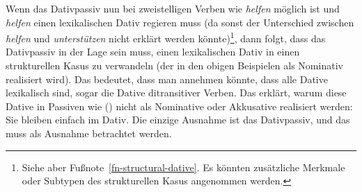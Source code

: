 Wenn das Dativpassiv nun bei zweistelligen Verben wie \emph{helfen} möglich ist und \emph{helfen}
einen lexikalischen Dativ regieren muss (da sonst der Unterschied zwischen \emph{helfen} und
\emph{unterstützen} nicht erklärt werden könnte)\footnote{%
  Siehe aber Fußnote~\ref{fn-structural-dative}. Es könnten zusätzliche Merkmale oder Subtypen des
  strukturellen Kasus angenommen werden.},
dann folgt, dass das Dativpassiv in der Lage sein muss,
einen lexikalischen Dativ in einen strukturellen Kasus zu verwandeln (der in den obigen Beispielen als Nominativ realisiert wird). Das
bedeutet, dass man annehmen könnte, dass alle Dative lexikalisch sind, sogar die Dative ditransitiver
Verben. Das erklärt, warum diese Dative in Passiven wie () nicht als Nominative oder Akkusative realisiert werden:
\eal
{}
\zl
Sie bleiben einfach im Dativ. Die einzige Ausnahme ist das Dativpassiv, und das muss als Ausnahme betrachtet werden.%
%







